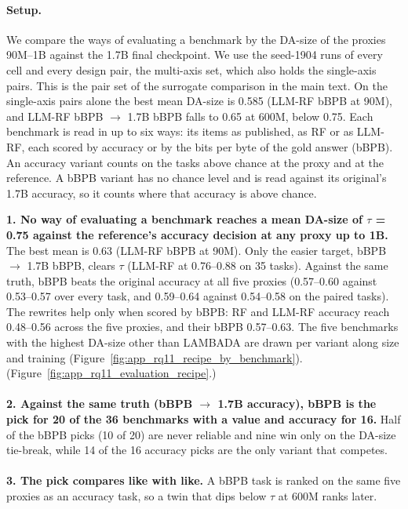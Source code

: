 {\begin{minipage}[t]{0.485\textwidth}
\paragraph{Setup.} We compare the ways of evaluating a benchmark by the DA-size of the proxies 90M--1B against the 1.7B final checkpoint. We use the seed-1904 runs of every cell and every design pair, the multi-axis set, which also holds the single-axis pairs. This is the pair set of the surrogate comparison in the main text. On the single-axis pairs alone the best mean DA-size is 0.585 (LLM-RF bBPB at 90M), and LLM-RF bBPB $\rightarrow$ 1.7B bBPB falls to 0.65 at 600M, below 0.75. Each benchmark is read in up to six ways: its items as published, as RF or as LLM-RF, each scored by accuracy or by the bits per byte of the gold answer (bBPB). An accuracy variant counts on the tasks above chance at the proxy and at the reference. A bBPB variant has no chance level and is read against its original's 1.7B accuracy, so it counts where that accuracy is above chance.
\end{minipage}\hfill
\begin{minipage}[t]{0.485\textwidth}
\vspace{0pt}
\begin{rqfinding}
\textbf{1. No way of evaluating a benchmark reaches a mean DA-size of $\tau$ = 0.75 against the reference's accuracy decision at any proxy up to 1B.} The best mean is 0.63 (LLM-RF bBPB at 90M). Only the easier target, bBPB $\rightarrow$ 1.7B bBPB, clears $\tau$ (LLM-RF at 0.76--0.88 on 35 tasks). Against the same truth, bBPB beats the original accuracy at all five proxies (0.57--0.60 against 0.53--0.57 over every task, and 0.59--0.64 against 0.54--0.58 on the paired tasks). The rewrites help only when scored by bBPB: RF and LLM-RF accuracy reach 0.48--0.56 across the five proxies, and their bBPB 0.57--0.63. The five benchmarks with the highest DA-size other than LAMBADA are drawn per variant along size and training (Figure~\ref{fig:app_rq11_recipe_by_benchmark}). (Figure~\ref{fig:app_rq11_evaluation_recipe}.)
\\
\\
\textbf{2. Against the same truth (bBPB $\rightarrow$ 1.7B accuracy), bBPB is the pick for 20 of the 36 benchmarks with a value and accuracy for 16.} Half of the bBPB picks (10 of 20) are never reliable and nine win only on the DA-size tie-break, while 14 of the 16 accuracy picks are the only variant that competes.
\\
\\
\textbf{3. The pick compares like with like.} A bBPB task is ranked on the same five proxies as an accuracy task, so a twin that dips below $\tau$ at 600M ranks later.
\end{rqfinding}
\end{minipage}

}
